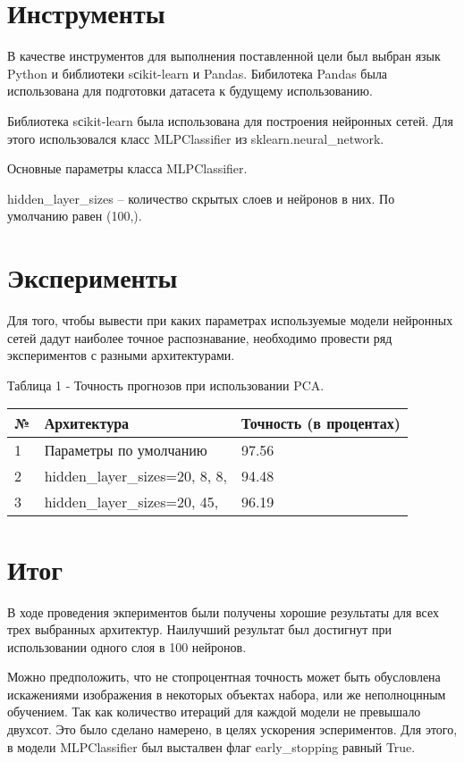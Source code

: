 \documentclass[a4paper,12pt]{article}
\begin{document}
	
\newpage\section{Инструменты} 
	В качестве инструментов для выполнения поставленной цели был выбран язык Python и библиотеки sсikit-learn и Pandas.
	Бибилотека Pandas была использована для подготовки датасета к будущему использованию.
	
	\vspace{0.5cm}
	Библиотека sсikit-learn была использована для построения нейронных сетей. Для этого использовался класс MLPClassifier из sklearn.neural\_network.
	
	\vspace{0.5cm}
	Основные параметры класса MLPClassifier.
	
	\vspace{0.5cm}
	hidden\_layer\_sizes – количество скрытых слоев и нейронов в них. По умолчанию равен (100,).

	
\newpage\section{Эксперименты}
	Для того, чтобы вывести при каких параметрах используемые модели нейронных сетей дадут наиболее точное распознавание, необходимо провести ряд экспериментов с разными архитектурами. 

	\vspace{0.5cm}
	Таблица 1 - Точность прогнозов  при использовании PCA.
\begin{longtable}{|p{1cm}|p{9cm}|p{3cm}|}
\hline
№ & Архитектура & Точность (в процентах) \\ 
\hline 
1 & Параметры по умолчанию & 97.56 \\
\hline
2 & hidden\_layer\_sizes=20, 8, 8,  & 94.48 \\
\hline 
3 & hidden\_layer\_sizes=20, 45, & 96.19 \\
\hline
\end{longtable}


\newpage\section{Итог}
	В ходе проведения экпериментов были получены хорошие результаты для всех трех выбранных архитектур. Наилучший результат был достигнут при использовании одного слоя в 100 нейронов. 
	
	\vspace{0.5cm}
	Можно предположить, что не стопроцентная точность может быть обусловлена искажениями изображения в некоторых объектах  набора, или же неполноцнным обучением. Так как количество итераций для каждой модели не превышало двухсот. Это было сделано намерено, в целях ускорения эспериментов. Для этого, в модели MLPClassifier был высталвен флаг early\_stopping равный True.
	
	
\end{document}

